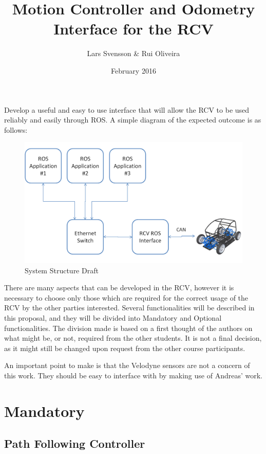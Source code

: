 \documentclass{article}
\title{Motion Controller and Odometry Interface for the RCV}
\author{Lars Svensson \& Rui Oliveira}
\date{February 2016}
\begin{document}
  
  
\maketitle

Develop a useful and easy to use interface that will allow the RCV to be used reliably and easily through ROS. A simple diagram of the expected outcome is as follows:


\begin{figure}[h!]
\centering
\includegraphics[width=1.0\textwidth]{systemStructure2.png}
\caption{System Structure Draft}
\label{fig:systemStructure}
\end{figure} 


There are many aspects that can be developed in the RCV, however it is necessary to choose only those which are required for the correct usage of the RCV by the other parties interested. Several functionalities will be described in this proposal, and they will be divided into Mandatory and Optional functionalities. The division made is based on a first thought of the authors on what might be, or not, required from the other students. It is not a final decision, as it might still be changed upon request from the other course participants.

An important point to make is that the Velodyne sensors are not a concern of this work. They should be easy to interface with by making use of Andreas' work.

\section{Mandatory}

\subsection{Path Following Controller}
\end{document}
